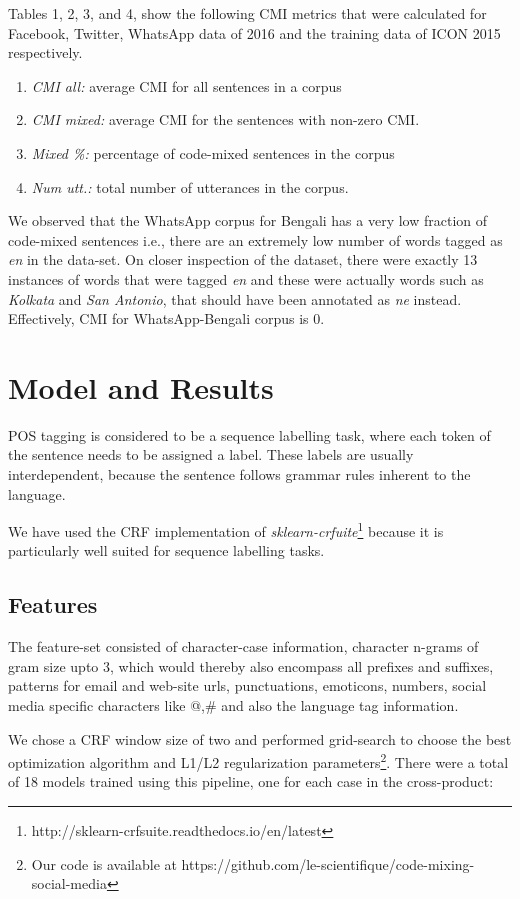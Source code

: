 \documentclass[11pt,a4paper]{article}
\begin{document}
Tables 1, 2, 3, and 4, show the following CMI metrics that were calculated for Facebook, Twitter, WhatsApp data of 2016 and the training data of ICON 2015 respectively.
\begin{enumerate}
\item \textit{CMI all:} average CMI for all sentences in a corpus
\item \textit{CMI mixed:} average CMI for the sentences with non-zero CMI.
\item \textit{Mixed \%:} percentage of code-mixed sentences in the corpus
\item \textit{Num utt.:} total number of utterances in the corpus.
\end{enumerate}
We observed that the WhatsApp corpus for Bengali has a very low fraction of code-mixed sentences i.e., there are an extremely low number of words tagged as \textit{en} in the data-set. On closer inspection of the dataset, there were exactly 13 instances of words that were tagged \textit{en} and these were actually words such as \textit{Kolkata} and \textit{San Antonio}, that should have been annotated as \textit{ne} instead. Effectively, CMI for WhatsApp-Bengali corpus is 0.    


\section{Model and Results}
POS tagging is considered to be a sequence labelling task, where each token of the sentence needs to be assigned a label. These labels are usually interdependent, because the sentence follows grammar rules inherent to the language.

We have used the CRF implementation of \textit{sklearn-crfuite}\footnote{http://sklearn-crfsuite.readthedocs.io/en/latest} because it is particularly well suited for sequence labelling tasks.   

\subsection{Features}
The feature-set consisted of character-case information, character n-grams of gram size upto 3, which would thereby also encompass all prefixes and suffixes, patterns for email and web-site urls, punctuations, emoticons, numbers, social media specific characters like @,\# and also the language tag information.

We chose a CRF window size of two and performed grid-search to choose the best optimization algorithm and L1/L2 regularization parameters\footnote{Our code is available at https://github.com/le-scientifique/code-mixing-social-media}. There were a total of 18 models trained using this pipeline, one for each case in the cross-product:
\end{document}
